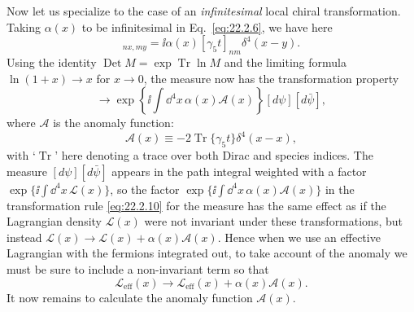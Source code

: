 Now let us specialize to the case of an \emph{infinitesimal} local chiral
transformation. Taking $\alpha(x)$ to be infinitesimal in
Eq.~\eqref{eq:22.2.6}, we have here
\begin{equation}
 [\mathcal U-\mathbf{1}]_{nx,my}
 =\ii\alpha(x)[\gamma_5t]_{nm}\delta^4(x-y).
 \tag{22.2.9}\label{eq:22.2.9}
\end{equation}
Using the identity $\operatorname{Det}M=\exp\operatorname{Tr}\ln M$ and
the limiting formula $\ln(1+x)\to x$ for $x\to0$, the measure now has the
transformation property
\begin{equation}
 [d\psi][d\bar\psi]\longrightarrow
 \exp\left\{\ii\int \dd^4x\,\alpha(x)\mathcal A(x)\right\}
 [d\psi][d\bar\psi],
 \tag{22.2.10}\label{eq:22.2.10}
\end{equation}
where $\mathcal A$ is the anomaly function:
\begin{equation}
 \mathcal A(x)\equiv-2\operatorname{Tr}\{\gamma_5t\}\delta^4(x-x),
 \tag{22.2.11}\label{eq:22.2.11}
\end{equation}
with `$\operatorname{Tr}$' here denoting a trace over both Dirac and species
indices. The measure $[d\psi][d\bar\psi]$ appears in the path integral
weighted with a factor $\exp\{\ii\int \dd^4x\,\mathcal L(x)\}$, so the
factor\linebreak
$\exp\{\ii\int \dd^4x\,\alpha(x)\mathcal A(x)\}$ in the transformation rule
\eqref{eq:22.2.10} for the measure has the same effect as if the Lagrangian
density $\mathcal L(x)$ were not invariant under these transformations, but
instead $\mathcal L(x)\to\mathcal L(x)+\alpha(x)\mathcal A(x)$. Hence when
we use an effective Lagrangian with the fermions integrated out, to take
account of the anomaly we must be sure to include a non-invariant term so
that
\begin{equation}
 \mathcal L_{\mathrm{eff}}(x)\longrightarrow
 \mathcal L_{\mathrm{eff}}(x)+\alpha(x)\mathcal A(x).
 \tag{22.2.12}\label{eq:22.2.12}
\end{equation}
It now remains to calculate the anomaly function $\mathcal A(x)$.


